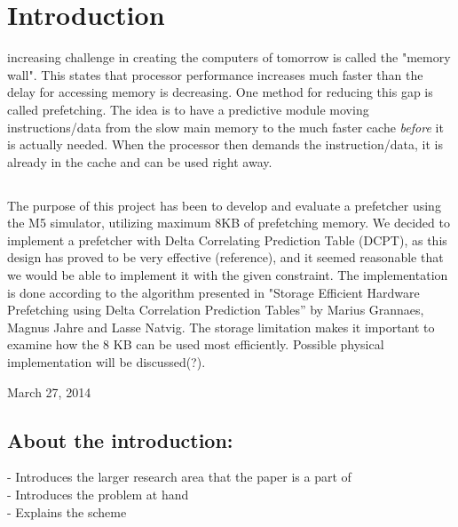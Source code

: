 \section{Introduction}
 increasing challenge in creating the computers of tomorrow is called the "memory wall". This states that processor performance increases much faster than the delay for accessing memory is decreasing. One method for reducing this gap is called prefetching. The idea is to have a predictive module moving instructions/data from the slow main memory to the much faster cache \emph{before} it is actually needed. When the processor then demands the instruction/data, it is already in the cache and can be used right away.

\subsection*{}
The purpose of this project has been to develop and evaluate a prefetcher using the M5 simulator, utilizing maximum 8KB of prefetching memory. We decided to implement a prefetcher with Delta Correlating Prediction Table (DCPT), as this design has proved to be very effective (reference), and it seemed reasonable that we would be able to implement it with the given constraint. The implementation is done according to the algorithm presented in "Storage Efficient Hardware Prefetching using Delta Correlation Prediction Tables” by Marius Grannaes, Magnus Jahre and Lasse Natvig. The storage limitation makes it important to examine how the 8 KB can be used most efficiently. Possible physical implementation will be discussed(?).


\hfill March 27, 2014

\subsection{About the introduction:}
- Introduces the larger research area that the paper is 
a part of\\
- Introduces the problem at hand\\
- Explains the scheme\\
